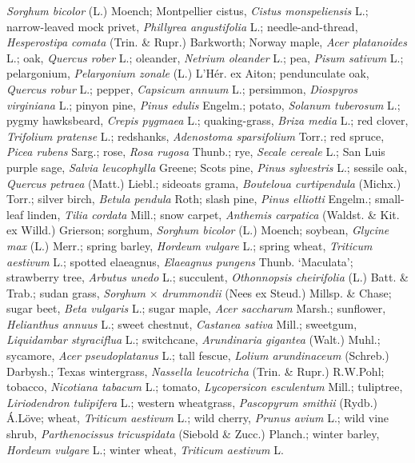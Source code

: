 \documentclass[10pt]{article}
\begin{document}
{\begin{ThreePartTable}
\begin{TableNotes}
\textit{Sorghum bicolor} (L.) Moench; Montpellier cistus, \textit{Cistus monspeliensis} L.; narrow-leaved mock privet, \textit{Phillyrea angustifolia} L.; needle-and-thread, \textit{Hesperostipa comata} (Trin. \& Rupr.) Barkworth; Norway maple, \textit{Acer platanoides} L.; oak, \textit{Quercus rober} L.; oleander, \textit{Netrium oleander} L.; pea, \textit{Pisum sativum} L.; pelargonium, \textit{Pelargonium zonale} (L.) L'H{\'{e}}r. ex Aiton; pendunculate oak, \textit{Quercus robur} L.; pepper, \textit{Capsicum annuum} L.; persimmon, \textit{Diospyros virginiana} L.; pinyon pine, \textit{Pinus edulis} Engelm.; potato, \textit{Solanum tuberosum} L.; pygmy hawksbeard, \textit{Crepis pygmaea} L.; quaking-grass, \textit{Briza media} L.; red clover, \textit{Trifolium pratense} L.; redshanks, \textit{Adenostoma sparsifolium} Torr.; red spruce, \textit{Picea rubens} Sarg.; rose, \textit{Rosa rugosa} Thunb.; rye, \textit{Secale cereale} L.; San Luis purple sage, \textit{Salvia leucophylla} Greene; Scots pine, \textit{Pinus sylvestris} L.; sessile oak, \textit{Quercus petraea} (Matt.) Liebl.; sideoats grama, \textit{Bouteloua curtipendula} (Michx.) Torr.; silver birch, \textit{Betula pendula} Roth; slash pine, \textit{Pinus elliotti} Engelm.; small-leaf linden, \textit{Tilia cordata} Mill.; snow carpet, \textit{Anthemis carpatica} (Waldst. \& Kit. ex Willd.) Grierson; sorghum, \textit{Sorghum bicolor} (L.) Moench; soybean, \textit{Glycine max} (L.) Merr.; spring barley, \textit{Hordeum vulgare} L.; spring wheat, \textit{Triticum aestivum} L.; spotted elaeagnus, \textit{Elaeagnus pungens} Thunb. `Maculata'; strawberry tree, \textit{Arbutus unedo} L.; succulent, \textit{Othonnopsis cheirifolia} (L.) Batt. \& Trab.; sudan grass, \textit{Sorghum} $\times$ \textit{drummondii} (Nees ex Steud.) Millsp. \& Chase; sugar beet, \textit{Beta vulgaris} L.; sugar maple, \textit{Acer saccharum} Marsh.; sunflower, \textit{Helianthus annuus} L.; sweet chestnut, \textit{Castanea sativa} Mill.; sweetgum, \textit{Liquidambar styraciflua} L.; switchcane, \textit{Arundinaria gigantea} (Walt.) Muhl.; sycamore, \textit{Acer pseudoplatanus} L.; tall fescue, \textit{Lolium arundinaceum} (Schreb.) Darbysh.; Texas wintergrass, \textit{Nassella leucotricha} (Trin. \& Rupr.) R.W.Pohl; tobacco, \textit{Nicotiana tabacum} L.; tomato, \textit{Lycopersicon esculentum} Mill.; tuliptree, \textit{Liriodendron tulipifera} L.; western wheatgrass, \textit{Pascopyrum smithii} (Rydb.) {\'{A}}.L{\"{o}}ve; wheat, \textit{Triticum aestivum} L.; wild cherry, \textit{Prunus avium} L.; wild vine shrub, \textit{Parthenocissus tricuspidata} (Siebold \& Zucc.) Planch.; winter barley, \textit{Hordeum vulgare} L.; winter wheat, \textit{Triticum aestivum} L.

\end{TableNotes}
\end{ThreePartTable}}
\end{document}
